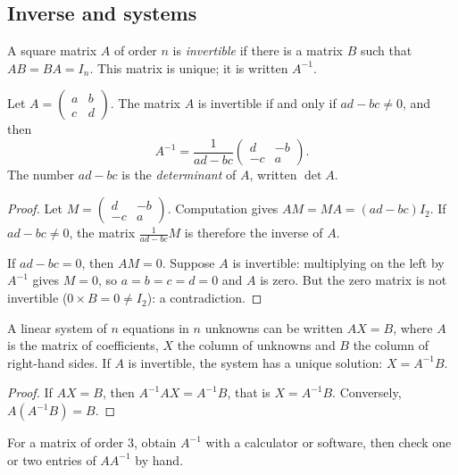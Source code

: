 \subsection{Inverse and systems}
\begin{definition}
A square matrix $A$ of order $n$ is \emph{invertible} if there is a matrix $B$ such that $AB=BA=I_n$. This matrix is unique; it is written $A^{-1}$.
\end{definition}
\begin{theorem}
Let $A=\begin{pmatrix}a&b\\c&d\end{pmatrix}$. The matrix $A$ is invertible if and only if $ad-bc\neq0$, and then
\[A^{-1}=\frac1{ad-bc}\begin{pmatrix}d&-b\\-c&a\end{pmatrix}.\]
The number $ad-bc$ is the \emph{determinant} of $A$, written $\det A$.
\end{theorem}
\begin{proof}
Let $M=\begin{pmatrix}d&-b\\-c&a\end{pmatrix}$. Computation gives $AM=MA=(ad-bc)I_2$. If $ad-bc\neq0$, the matrix $\frac1{ad-bc}M$ is therefore the inverse of $A$.\par
If $ad-bc=0$, then $AM=0$. Suppose $A$ is invertible: multiplying on the left by $A^{-1}$ gives $M=0$, so $a=b=c=d=0$ and $A$ is zero. But the zero matrix is not invertible ($0\times B=0\neq I_2$): a contradiction.
\end{proof}
\begin{theorem}
A linear system of $n$ equations in $n$ unknowns can be written $AX=B$, where $A$ is the matrix of coefficients, $X$ the column of unknowns and $B$ the column of right-hand sides. If $A$ is invertible, the system has a unique solution: $X=A^{-1}B$.
\end{theorem}
\begin{proof}
If $AX=B$, then $A^{-1}AX=A^{-1}B$, that is $X=A^{-1}B$. Conversely, $A\left(A^{-1}B\right)=B$.
\end{proof}
\begin{method}
For a matrix of order $3$, obtain $A^{-1}$ with a calculator or software, then check one or two entries of $AA^{-1}$ by hand.
\end{method}

